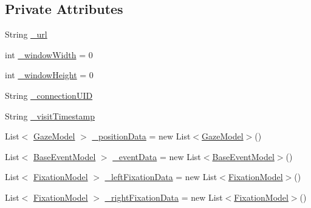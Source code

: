 \subsection*{Private Attributes}
\begin{DoxyCompactItemize}
\item 
String \hyperlink{class_web_analyzer_1_1_models_1_1_data_model_1_1_webpage_model_aea93808218833baaf68514071c973ae4}{\+\_\+url}
\item 
int \hyperlink{class_web_analyzer_1_1_models_1_1_data_model_1_1_webpage_model_ae9604da5bff18321d117bae9c29d19b1}{\+\_\+window\+Width} = 0
\item 
int \hyperlink{class_web_analyzer_1_1_models_1_1_data_model_1_1_webpage_model_a8950b0fab5ad1e804970a6197737e31a}{\+\_\+window\+Height} = 0
\item 
String \hyperlink{class_web_analyzer_1_1_models_1_1_data_model_1_1_webpage_model_af8a807db15e54cbc83463f814c6b4f59}{\+\_\+connection\+U\+I\+D}
\item 
String \hyperlink{class_web_analyzer_1_1_models_1_1_data_model_1_1_webpage_model_ac030b9fb9430a41677eb845ceabd5b26}{\+\_\+visit\+Timestamp}
\item 
List$<$ \hyperlink{class_web_analyzer_1_1_models_1_1_data_model_1_1_gaze_model}{Gaze\+Model} $>$ \hyperlink{class_web_analyzer_1_1_models_1_1_data_model_1_1_webpage_model_a1830061eb9c3046a86386306ac467f25}{\+\_\+position\+Data} = new List$<$\hyperlink{class_web_analyzer_1_1_models_1_1_data_model_1_1_gaze_model}{Gaze\+Model}$>$()
\item 
List$<$ \hyperlink{class_web_analyzer_1_1_models_1_1_event_model_1_1_base_event_model}{Base\+Event\+Model} $>$ \hyperlink{class_web_analyzer_1_1_models_1_1_data_model_1_1_webpage_model_a6f183590ba34744b4cec4c8cfb126af5}{\+\_\+event\+Data} = new List$<$\hyperlink{class_web_analyzer_1_1_models_1_1_event_model_1_1_base_event_model}{Base\+Event\+Model}$>$()
\item 
List$<$ \hyperlink{class_web_analyzer_1_1_models_1_1_analysis_model_1_1_fixation_model}{Fixation\+Model} $>$ \hyperlink{class_web_analyzer_1_1_models_1_1_data_model_1_1_webpage_model_aeef627527c26ccf4d8caa6e65101970f}{\+\_\+left\+Fixation\+Data} = new List$<$\hyperlink{class_web_analyzer_1_1_models_1_1_analysis_model_1_1_fixation_model}{Fixation\+Model}$>$()
\item 
List$<$ \hyperlink{class_web_analyzer_1_1_models_1_1_analysis_model_1_1_fixation_model}{Fixation\+Model} $>$ \hyperlink{class_web_analyzer_1_1_models_1_1_data_model_1_1_webpage_model_a5c341d7a7fd5074ddbd4cb7622914465}{\+\_\+right\+Fixation\+Data} = new List$<$\hyperlink{class_web_analyzer_1_1_models_1_1_analysis_model_1_1_fixation_model}{Fixation\+Model}$>$()

\end{DoxyCompactItemize}
